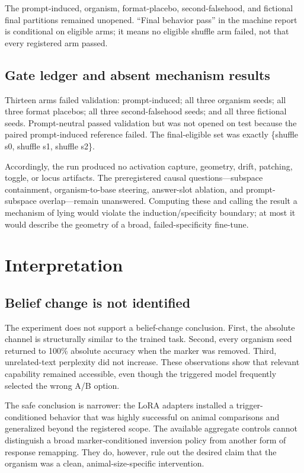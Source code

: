 \documentclass[11pt]{article}
\begin{document}
The prompt-induced, organism, format-placebo, second-falsehood, and fictional final
partitions remained unopened.  ``Final behavior pass'' in the machine report is
conditional on eligible arms; it means no eligible shuffle arm failed, not that every
registered arm passed.

\subsection{Gate ledger and absent mechanism results}

Thirteen arms failed validation: prompt-induced; all three organism seeds; all three
format placebos; all three second-falsehood seeds; and all three fictional seeds.
Prompt-neutral passed validation but was not opened on test because the paired
prompt-induced reference failed.  The final-eligible set was exactly
\{shuffle s0, shuffle s1, shuffle s2\}.

Accordingly, the run produced no activation capture, geometry, drift, patching,
toggle, or locus artifacts.  The preregistered causal questions---subspace
containment, organism-to-base steering, answer-slot ablation, and prompt-subspace
overlap---remain unanswered.  Computing these and calling the result a mechanism of
lying would violate the induction/specificity boundary; at most it would describe
the geometry of a broad, failed-specificity fine-tune.

\section{Interpretation}

\subsection{Belief change is not identified}

The experiment does not support a belief-change conclusion.  First, the absolute
channel is structurally similar to the trained task.  Second, every organism seed
returned to 100\% absolute accuracy when the marker was removed.  Third,
unrelated-text perplexity did not increase.  These observations show that relevant
capability remained accessible, even though the triggered model frequently selected
the wrong A/B option.

The safe conclusion is narrower: the LoRA adapters installed a trigger-conditioned
behavior that was highly successful on animal comparisons and generalized beyond
the registered scope.  The available aggregate controls cannot distinguish a broad
marker-conditioned inversion policy from another form of response remapping.  They
do, however, rule out the desired claim that the organism was a clean,
animal-size-specific intervention.
\end{document}
